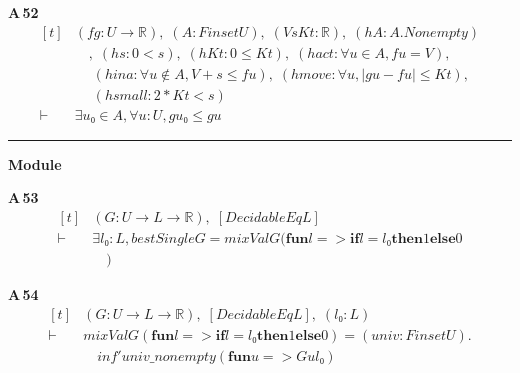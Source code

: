 \noindent\textbf{A\,52}\quad{}
{\footnotesize\[ \begin{aligned}[t]
&(\mathit{f} \mathit{g} : \mathit{U} \to \mathbb{R} ),\; (\mathit{A} : \mathit{Finset} \mathit{U}),\; (\mathit{V} \mathit{s} \mathit{Kt} : \mathbb{R} ),\; (\mathit{hA} : \mathit{A}.\mathit{Nonempty})\\
&\quad ,\; (\mathit{hs} : 0 < \mathit{s}),\; (\mathit{hKt} : 0 \leq \mathit{Kt}),\; (\mathit{hact} : \forall \mathit{u} \in \mathit{A}, \mathit{f} \mathit{u} = \mathit{V}),\\
&\quad \; (\mathit{hina} : \forall \mathit{u} \notin \mathit{A}, \mathit{V} + \mathit{s} \leq \mathit{f} \mathit{u}),\; (\mathit{hmove} : \forall \mathit{u}, |\mathit{g} \mathit{u} - \mathit{f} \mathit{u}| \leq \mathit{Kt}),\\
&\quad \; (\mathit{hsmall} : 2 * \mathit{Kt} < \mathit{s})\\
\vdash\;&\exists \mathit{u₀} \in \mathit{A}, \forall \mathit{u} : \mathit{U}, \mathit{g} \mathit{u₀} \leq \mathit{g} \mathit{u}
\end{aligned} \]}

\vspace{4pt}\noindent\rule{\columnwidth}{0.4pt}\par\vspace{2pt}
\noindent\textbf{Module }\par\vspace{3pt}

\noindent\textbf{A\,53}\quad{}
{\footnotesize\[ \begin{aligned}[t]
&(\mathit{G} : \mathit{U} \to \mathit{L} \to \mathbb{R} ),\; [\mathit{DecidableEq} \mathit{L}]\\
\vdash\;&\exists \mathit{l₀} : \mathit{L}, \mathit{bestSingle} \mathit{G} = \mathit{mixVal} \mathit{G} (\mathbf{fun} \mathit{l} => \mathbf{if} \mathit{l} = \mathit{l₀} \mathbf{then} 1 \mathbf{else} 0\\
&\quad )
\end{aligned} \]}

\noindent\textbf{A\,54}\quad{}
{\footnotesize\[ \begin{aligned}[t]
&(\mathit{G} : \mathit{U} \to \mathit{L} \to \mathbb{R} ),\; [\mathit{DecidableEq} \mathit{L}],\; (\mathit{l₀} : \mathit{L})\\
\vdash\;&\mathit{mixVal} \mathit{G} (\mathbf{fun} \mathit{l} => \mathbf{if} \mathit{l} = \mathit{l₀} \mathbf{then} 1 \mathbf{else} 0) = (\mathit{univ} : \mathit{Finset} \mathit{U}).\\
&\quad \mathit{inf'} \mathit{univ\_nonempty} (\mathbf{fun} \mathit{u} => \mathit{G} \mathit{u} \mathit{l₀})
\end{aligned} \]}

